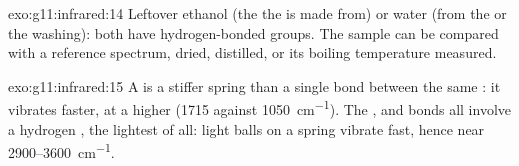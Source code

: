\begin{solution}{exo:g11:infrared:14}
Leftover ethanol (the  the  is made from) or water (from
the  or the washing): both have hydrogen-bonded  groups. The
sample can be compared with a reference spectrum, dried, distilled, or
its boiling temperature measured.
\end{solution}

\begin{solution}{exo:g11:infrared:15}
A  is a stiffer spring than a single bond between the same
: it vibrates faster, at a higher  (1715 against
\qty{1050}{cm^{-1}}). The ,  and  bonds all
involve a hydrogen , the lightest of all: light balls on a spring
vibrate fast, hence  near 2900--\qty{3600}{cm^{-1}}.
\end{solution}

